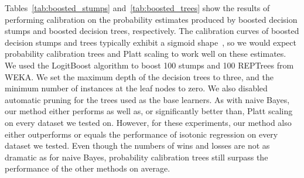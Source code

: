 \documentclass[wcp]{jmlr}
\begin{document}
Tables~\ref{tab:boosted_stumps} and~\ref{tab:boosted_trees} show the results of performing calibration on the probability estimates produced by boosted decision stumps and boosted decision trees, respectively. The calibration curves of boosted decision stumps and trees typically exhibit a sigmoid shape~\citep{niculescu2005predicting}, so we would expect probability calibration trees and Platt scaling to work well on these estimates. We used the LogitBoost algorithm to boost 100 stumps and 100 REPTrees from WEKA. We set the maximum depth of the decision trees to three, and the minimum number of instances at the leaf nodes to zero. We also disabled automatic pruning for the trees used as the base learners. As with naive Bayes, our method either performs as well as, or significantly better than, Platt scaling on every dataset we tested on. However, for these experiments, our method also either outperforms or equals the performance of isotonic regression on every dataset we tested. Even though the numbers of wins and losses are not as dramatic as for naive Bayes, probability calibration trees still surpass the performance of the other methods on average.
\end{document}
